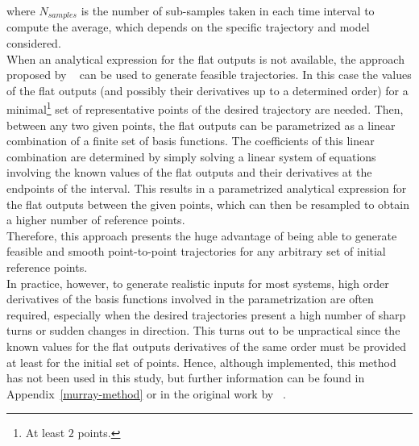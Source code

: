 \documentclass[../main.tex]{subfiles}
\begin{document}
where $N_{samples}$ is the number of sub-samples taken in each time interval to
compute the average, which depends on the specific trajectory and model considered.\\
When an analytical expression for the flat outputs is not available, the
approach proposed by ~\cite{murray} can be used to generate feasible
trajectories. In this case the values of the flat outputs (and possibly their
derivatives up to a determined order) for a minimal\footnote{At least $2$
points.} set of representative points of the desired trajectory are needed.
Then, between any two given points, the flat outputs can be parametrized as a
linear combination of a finite set of basis functions. The coefficients of this
linear combination are determined by simply solving a linear system of equations
involving the known values of the flat outputs and their derivatives at the
endpoints of the interval. This results in a parametrized analytical expression
for the flat outputs between the given points, which can then be resampled to
obtain a higher number of reference points.\\
Therefore, this approach presents the huge advantage of being able to generate
feasible and smooth point-to-point trajectories for any arbitrary set of initial
reference points.\\
In practice, however, to generate realistic inputs for most systems, high order
derivatives of the basis functions involved in the parametrization are often required,
especially when the desired trajectories present a high number of sharp turns
or sudden changes in direction. This turns out to be unpractical since the known
values for the flat outputs derivatives of the same order must be provided at
least for the initial set of points. Hence, although implemented, this method
has not been used in this study, but further information can be found in
Appendix~\ref{murray-method} or in the original work by
~\cite{murray}.
\end{document}
